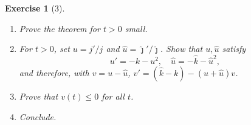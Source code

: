 \documentclass{article}
\theoremstyle{plain}
\newtheorem*{ex}{Exercise}
\theoremstyle{nonumberplain}
\begin{document}
\begin{ex}[3]
\leavevmode
\begin{enumerate}
\item Prove the theorem for $t > 0$ small.
\item For $t > 0$, set $u = j'/j$ and $\hat u = \hat\jmath'/\hat\jmath$. Show that $u, \hat u$ satisfy
\begin{equation}
u' = -k-u^2, \quad \hat u = -\hat k - \hat u^2,
\end{equation}
and therefore, with $v = u-\hat u$, $v' = (\hat k - k) - ( u + \hat u) v$.
\item Prove that $v(t) \leq 0$ for all $t$.
\item Conclude.
\end{enumerate}
\end{ex}
\end{document}
